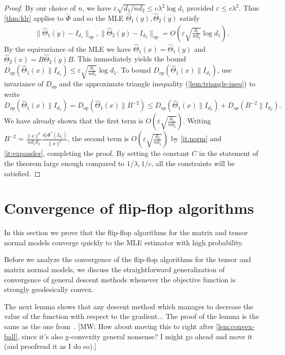 \documentclass[aos]{imsart}
\theoremstyle{definition}
\numberwithin{equation}{section}
\newcommand{\htheta}{\widehat{\Theta}}
\newcommand{\eps}{\varepsilon}
\newcommand{\MW}[1]{{\color{red}[MW: #1]}}
\begin{document}
\begin{proof}
By our choice of $n$, we have $\eps \sqrt{d_1/nd_2} \leq c\lambda^2\log d_1$ provided $\eps \leq c\lambda^2$. Thus \cref{thm:klr} applies to $\tilde{\Phi}$ and so the MLE $\htheta_1(y), \htheta_2(y)$ satisfy
\begin{gather*} \| \htheta_1(y) - I_{d_1}\|_{op}, \| \htheta_2(y) - I_{d_2}\|_{op} = O\left(\eps \sqrt{\frac{d_1}{n d_2}} \log d_1\right).\end{gather*}
By the equivariance of the MLE we have $\htheta_1(x) = \htheta_1(y)$ and $\htheta_2(x) = B \htheta_2 (y) B$. This immediately yields the bound $ D_{op}(\htheta_1(x) \rVert I_{d_1}) \leq \eps \sqrt{\frac{d_1}{n d_2}} \log d_1.$
To bound $D_{op}(\htheta_1(x) \rVert I_{d_1})$, use invariance of $D_{op}$ and the approximate triangle inequality (\cref{lem:triangle-ineq}) to write
$$D_{op}(\htheta_1(x) \rVert I_{d_2}) = D_{op}(\htheta_1(x) \rVert B^{-2}) \leq D_{op}(\htheta_1(x)\rVert I_{d_2}) + D_{op}(B^{-2}\rVert I_{d_2}).$$
We have already shown that the first term is $O(\eps \sqrt{\frac{d_1}{n d_2}}).$ Writing $B^{-2} = \frac{\|x\|^2}{nd_1 d_2} \frac{d_2 \Phi^*(I_{d_1})}{\|x\|^2}$, the second term is $O(\eps \sqrt{\frac{d_2}{n d_1}})$ by \cref{it:norm} and \cref{it:expander}, completing the proof.  By setting the constant $C$ in the statement of the theorem large enough compared to $1/\lambda, 1/c$, all the constraints will be satisfied.
\end{proof}










\section{Convergence of flip-flop algorithms}

In this section we prove that the flip-flop algorithms for the matrix and tensor normal models converge quickly to the MLE estimator with high probability.

Before we analyze the convergence of the flip-flop algorithms for the tensor and matrix normal models, we discuss the straightforward generalization of convergence of general descent methods whenever the objective function is strongly geodesically convex.

The next lemma shows that any descent method which manages to decrease the value of the function with respect to the gradient...
The proof of the lemma is the same as the one from~\cite[Lemma 4.8]{FM20}.
\MW{How about moving this to right after \cref{lem:convex-ball}, since it's also g-convexity general nonsense? I might go ahead and move it (and proofread it as I do so).}
\end{document}

